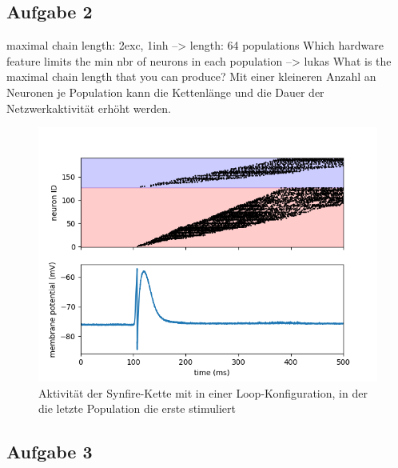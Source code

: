 \documentclass[10pt,a4paper]{scrartcl}
\begin{document}
\subsection{Aufgabe 2}
maximal chain length: 2exc, 1inh --> length: 64 populations
Which hardware feature limits the min nbr of neurons in each population --> lukas
What is the maximal chain length that you can produce?
Mit einer kleineren Anzahl an Neuronen je Population kann die Kettenlänge und die Dauer der Netzwerkaktivität erhöht werden.

\begin{figure} [ht]
\begin{center}
\label{fig:abb4}
\caption{Aktivität der Synfire-Kette mit in einer Loop-Konfiguration, in der die letzte Population die erste stimuliert}
\includegraphics[scale=0.35]{pictures/chainlength_64.png}
\end{center}
\end{figure}


\subsection{Aufgabe 3}
\end{document}
